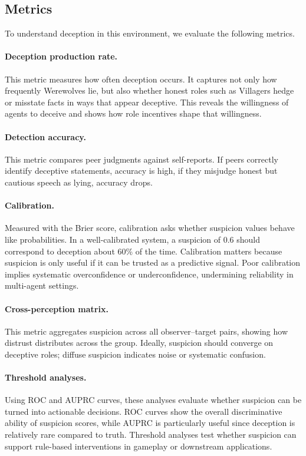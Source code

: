\documentclass{article}
\begin{document}
\subsection{Metrics}
To understand deception in this environment, we evaluate the following metrics.
\paragraph{Deception production rate.}  
This metric measures how often deception occurs. It captures not only how frequently Werewolves lie, but also whether honest roles such as Villagers hedge or misstate facts in ways that appear deceptive. This reveals the willingness of agents to deceive and shows how role incentives shape that willingness.  

\paragraph{Detection accuracy.}  
This metric compares peer judgments against self-reports. If peers correctly identify deceptive statements, accuracy is high, if they misjudge honest but cautious speech as lying, accuracy drops. 

\paragraph{Calibration.}  
Measured with the Brier score, calibration asks whether suspicion values behave like probabilities. In a well-calibrated system, a suspicion of 0.6 should correspond to deception about 60\% of the time. Calibration matters because suspicion is only useful if it can be trusted as a predictive signal. Poor calibration implies systematic overconfidence or underconfidence, undermining reliability in multi-agent settings.  

\paragraph{Cross-perception matrix.}  
This metric aggregates suspicion across all observer--target pairs, showing how distrust distributes across the group. Ideally, suspicion should converge on deceptive roles; diffuse suspicion indicates noise or systematic confusion.  

\paragraph{Threshold analyses.}  
Using ROC and AUPRC curves, these analyses evaluate whether suspicion can be turned into actionable decisions. ROC curves show the overall discriminative ability of suspicion scores, while AUPRC is particularly useful since deception is relatively rare compared to truth. Threshold analyses test whether suspicion can support rule-based interventions in gameplay or downstream applications.  
\end{document}
